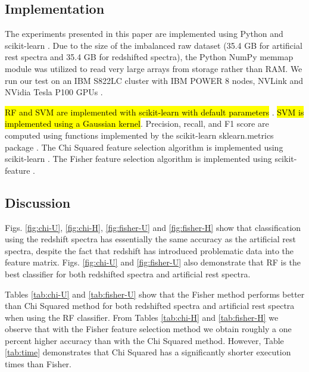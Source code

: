 \documentclass[conference]{IEEEtran}
\DeclareRobustCommand{\hlorange}[1]{{\sethlcolor{orange}\hl{#1}}}
\begin{document}
	\subsection{Implementation}\label{sec:imp}

	The experiments presented in this paper are implemented using Python and scikit-learn \cite{scikit-learn}. Due to the size of the imbalanced raw dataset (35.4 GB for artificial rest spectra and 35.4 GB for redshifted spectra), the Python NumPy memmap \cite{numpy, memmap} module was utilized to read very large arrays from storage rather than RAM. We run our test on an IBM S822LC cluster with IBM POWER 8 nodes, NVLink and NVidia Tesla P100 GPUs \cite{turing}.

	\hlorange{RF and SVM are implemented with scikit-learn with default parameters} \cite{scikit-learn}. \hlorange{SVM is implemented using a Gaussian kernel}. Precision, recall, and F1 score are computed using functions implemented by the scikit-learn sklearn.metrics package \cite{scikit-learn}. The Chi Squared feature selection algorithm is implemented using scikit-learn \cite{scikit-learn}. The Fisher feature selection algorithm is implemented using scikit-feature \cite{reliefF}.
	\subsection{Discussion}\label{sec:disc}

	Figs. \ref{fig:chi-U}, \ref{fig:chi-H}, \ref{fig:fisher-U} and \ref{fig:fisher-H} show that classification using the redshift spectra has essentially the same accuracy as the artificial rest spectra, despite the fact that redshift has introduced problematic data into the feature matrix. Figs. \ref{fig:chi-U} and  \ref{fig:fisher-U} also demonstrate that RF is the best classifier for both redshifted spectra and artificial rest spectra. 

	Tables \ref{tab:chi-U} and \ref{tab:fisher-U} show that the Fisher method performs better than Chi Squared method for both redshifted spectra and artificial rest spectra when using the RF classifier. From Tables \ref{tab:chi-H} and \ref{tab:fisher-H} we observe that with the Fisher feature selection method we obtain roughly a one percent higher accuracy than with the Chi Squared method. However, Table \ref{tab:time} demonstrates that Chi Squared has a significantly shorter execution times than Fisher. 
\end{document}
